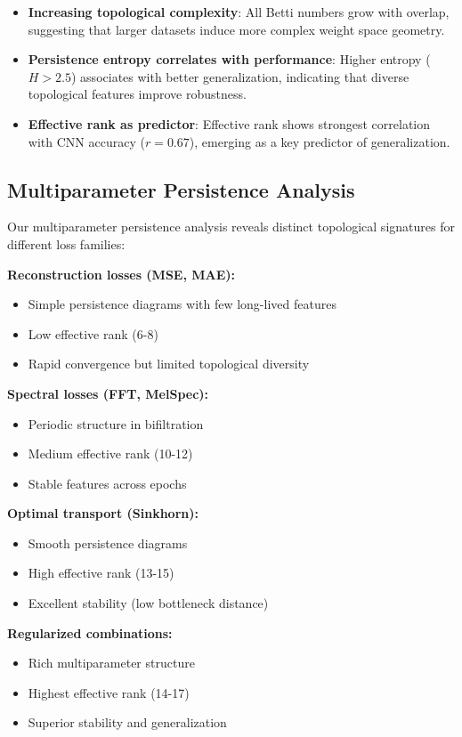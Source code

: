 \begin{itemize}
    \item \textbf{Increasing topological complexity}: All Betti numbers grow with overlap, suggesting that larger datasets induce more complex weight space geometry.
    \item \textbf{Persistence entropy correlates with performance}: Higher entropy ($H > 2.5$) associates with better generalization, indicating that diverse topological features improve robustness.
    \item \textbf{Effective rank as predictor}: Effective rank shows strongest correlation with CNN accuracy ($r = 0.67$), emerging as a key predictor of generalization.
\end{itemize}

\subsection{Multiparameter Persistence Analysis}

Our multiparameter persistence analysis reveals distinct topological signatures for different loss families:

\textbf{Reconstruction losses (MSE, MAE):}
\begin{itemize}
    \item Simple persistence diagrams with few long-lived features
    \item Low effective rank (6-8)
    \item Rapid convergence but limited topological diversity
\end{itemize}

\textbf{Spectral losses (FFT, MelSpec):}
\begin{itemize}
    \item Periodic structure in bifiltration
    \item Medium effective rank (10-12)
    \item Stable features across epochs
\end{itemize}

\textbf{Optimal transport (Sinkhorn):}
\begin{itemize}
    \item Smooth persistence diagrams
    \item High effective rank (13-15)
    \item Excellent stability (low bottleneck distance)
\end{itemize}

\textbf{Regularized combinations:}
\begin{itemize}
    \item Rich multiparameter structure
    \item Highest effective rank (14-17)
    \item Superior stability and generalization
\end{itemize}


